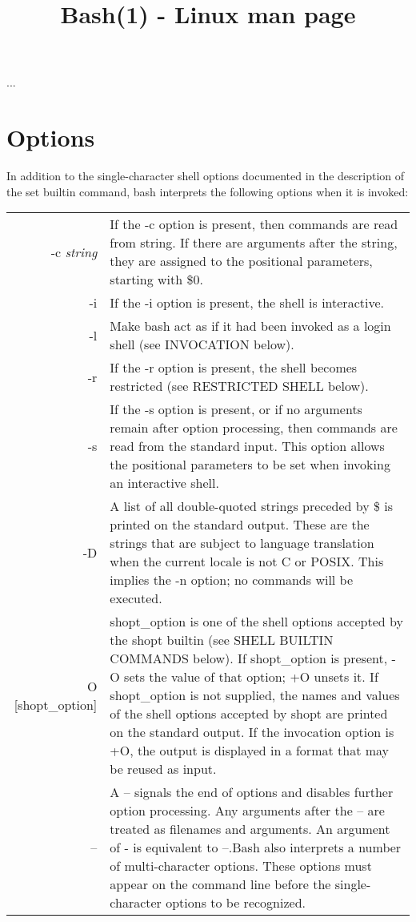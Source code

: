 \documentclass{article}
\title{Bash(1) - Linux man page}
\begin{document}
...
\section{Options}
In addition to the single-character shell options documented in the description of the set builtin command, bash interprets the following options when it is invoked:

\renewcommand{\arraystretch}{1.5}
\newcommand{\ttext}[2]{\fontfamily{qcr}\selectfont#1\textit{#2}}

\begin{tabular}{rp{}}
\ttext{-c }{string} & 
If the -c option is present, then commands are read from string. If there are arguments after the string, they are assigned to the positional parameters, starting with \$0. \\
\ttext{-i}{} & 
If the -i option is present, the shell is interactive. \\
\ttext{-l}{} & 
Make bash act as if it had been invoked as a login shell (see INVOCATION below). \\
\ttext{-r}{} & 
If the -r option is present, the shell becomes restricted (see RESTRICTED SHELL below). \\
\ttext{-s}{} & 
If the -s option is present, or if no arguments remain after option processing, then commands are read from the standard input. This option allows the positional parameters to be set when invoking an interactive shell. \\
\ttext{-D}{} & 
A list of all double-quoted strings preceded by \$ is printed on the standard output. These are the strings that are subject to language translation when the current locale is not C or POSIX. This implies the -n option; no commands will be executed. \\
\ttext{[-+]O [shopt\_option]}{} & 
shopt\_option is one of the shell options accepted by the shopt builtin (see SHELL BUILTIN COMMANDS below). If shopt\_option is present, -O sets the value of that option; +O unsets it. If shopt\_option is not supplied, the names and values of the shell options accepted by shopt are printed on the standard output. If the invocation option is +O, the output is displayed in a format that may be reused as input. \\
\ttext{--}{} & 
A -- signals the end of options and disables further option processing. Any arguments after the -- are treated as filenames and arguments. An argument of - is equivalent to --.\newline Bash also interprets a number of multi-character options. These options must appear on the command line before the single-character options to be recognized.\\

\end{tabular}
\end{document}
